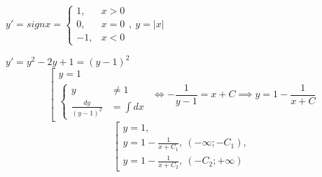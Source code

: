 \begin{example}
    $y'=sign x = \left\{\begin{array}{rl}
            1,  & x > 0 \\
            0,  & x = 0 \\
            -1, & x < 0
        \end{array}\right., \ y = |x|$
\end{example}

\begin{example}
    $y' = y^2 - 2y + 1 = (y-1)^2$
    \[
        \left[\begin{array}{l}
            y = 1 \\
            \left\{\begin{array}{rl}
                       y                    & \ne 1     \\
                       \frac{dy}{(y - 1)^2} & = \int dx
                   \end{array}\right.
        \end{array}\right. \iff -\frac{1}{y-1} = x + C \implies y = 1 - \frac{1}{x + C}
    \]
    \[
        \left[\begin{array}{l}
            y = 1,                                       \\
            y = 1 - \frac{1}{x + C_1}, \ (-\infty;-C_1), \\
            y = 1 - \frac{1}{x + C_2}, \ (-C_2;+\infty)
        \end{array}\right.
    \]
\end{example}